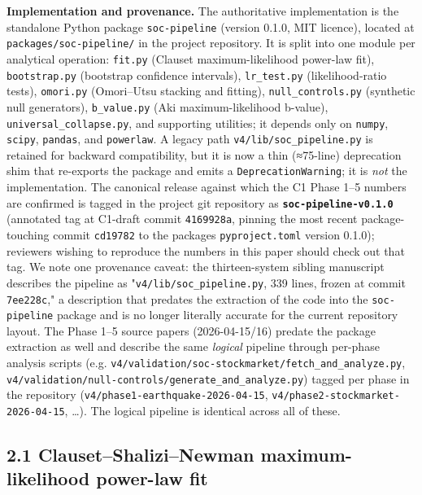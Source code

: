 \documentclass[
  11pt]{article}
\begin{document}
\textbf{Implementation and provenance.} The authoritative implementation
is the standalone Python package \texttt{soc-pipeline} (version 0.1.0,
MIT licence), located at \texttt{packages/soc-pipeline/} in the project
repository. It is split into one module per analytical operation:
\texttt{fit.py} (Clauset maximum-likelihood power-law fit),
\texttt{bootstrap.py} (bootstrap confidence intervals),
\texttt{lr\_test.py} (likelihood-ratio tests), \texttt{omori.py}
(Omori--Utsu stacking and fitting), \texttt{null\_controls.py}
(synthetic null generators), \texttt{b\_value.py} (Aki
maximum-likelihood b-value), \texttt{universal\_collapse.py}, and
supporting utilities; it depends only on \texttt{numpy}, \texttt{scipy},
\texttt{pandas}, and \texttt{powerlaw}. A legacy path
\texttt{v4/lib/soc\_pipeline.py} is retained for backward compatibility,
but it is now a thin (≈75-line) deprecation shim that re-exports the
package and emits a \texttt{DeprecationWarning}; it is \emph{not} the
implementation. The canonical release against which the C1 Phase 1--5
numbers are confirmed is tagged in the project git repository as
\textbf{\texttt{soc-pipeline-v0.1.0}} (annotated tag at C1-draft commit
\texttt{4169928a}, pinning the most recent package-touching commit
\texttt{cd19782} to the package\textquotesingle s
\texttt{pyproject.toml} version 0.1.0); reviewers wishing to reproduce
the numbers in this paper should check out that tag. We note one
provenance caveat: the thirteen-system sibling manuscript describes the
pipeline as "\texttt{v4/lib/soc\_pipeline.py}, 339 lines, frozen at
commit \texttt{7ee228c}," a description that predates the extraction of
the code into the \texttt{soc-pipeline} package and is no longer
literally accurate for the current repository layout. The Phase 1--5
source papers (2026-04-15/16) predate the package extraction as well and
describe the same \emph{logical} pipeline through per-phase analysis
scripts (e.g.
\texttt{v4/validation/soc-stockmarket/fetch\_and\_analyze.py},
\texttt{v4/validation/null-controls/generate\_and\_analyze.py}) tagged
per phase in the repository (\texttt{v4/phase1-earthquake-2026-04-15},
\texttt{v4/phase2-stockmarket-2026-04-15}, \ldots). The logical pipeline
is identical across all of these.

\subsection{2.1 Clauset--Shalizi--Newman maximum-likelihood power-law
fit}\label{21-clausetshalizinewman-maximum-likelihood-power-law-fit}
\end{document}
